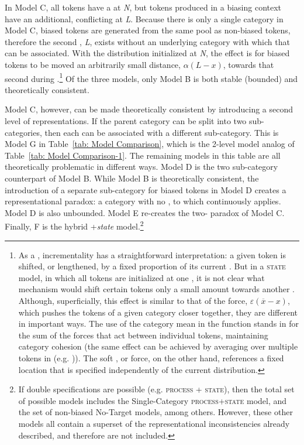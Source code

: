 In Model C, all tokens have a  at \emph{N}, but tokens produced
in a biasing context have an additional, conflicting  at \emph{L}.
Because there is only a single category in Model C, biased tokens
are generated from the same pool as non-biased tokens, therefore the
second , \emph{L}, exists without an underlying category with
which that  can be associated. With the distribution initialized
at \emph{N}, the effect is for biased tokens to be moved an arbitrarily
small distance, $\alpha(L-x)$, towards that second  during
.\footnote{As a , incrementality has a straightforward interpretation:
a given token is shifted, or lengthened, by a fixed proportion of
its current . But in a \textsc{state} model, in which all tokens
are initialized at one , it is not clear what mechanism would
shift certain tokens only a small amount towards another . Although,
superficially, this effect is similar to that of the 
force, $\varepsilon(\overline{x}-x)$, which pushes the tokens of
a given category closer together, they are different in important
ways. The use of the category mean in the  function stands
in for the sum of the forces that act between individual tokens, maintaining
category cohesion (the same effect can be achieved by averaging over
multiple tokens in  (e.g. \citealt{Pierrehumbert2000,Wedela})).
The soft , or  force, on the other hand, references a
fixed  location that is specified independently of the current
distribution. } Of the three models, only Model B is both stable (bounded) and
theoretically consistent. 

Model C, however, can be made theoretically consistent by introducing
a second level of representations. If the parent category can be split
into two sub-categories, then each  can be associated with a
different sub-category. This is Model G in Table~\ref{tab: Model Comparison},
which is the 2-level model analog of Table~\ref{tab: Model Comparison-1}.
The remaining models in this table are all theoretically problematic
in different ways. Model D is the two sub-category counterpart of
Model B. While Model B is theoretically consistent, the introduction
of a separate sub-category for biased tokens in Model D creates a
representational paradox: a category with no , to which 
continuously applies. Model D is also unbounded. Model E re-creates
the two- paradox of Model C. Finally, F is the hybrid +\emph{state}
model.\footnote{If double specifications are possible (e.g. \textsc{process} + \textsc{state}),
then the total set of possible models includes the Single-Category
\textsc{process}+\textsc{state} model, and the set of non-biased No-Target
models, among others. However, these other models all contain a superset
of the representational inconsistencies already described, and therefore
are not included.}

